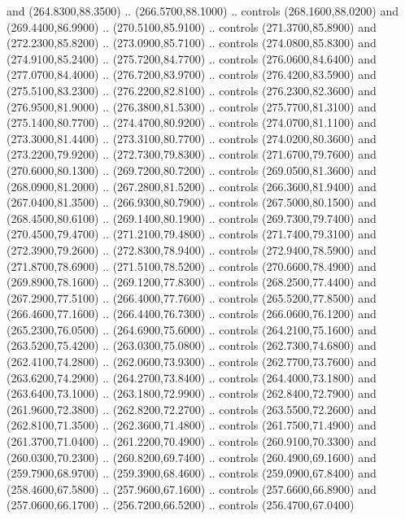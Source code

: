 {\begin{scope}[y=0.80pt, x=0.80pt, yscale=-1, xscale=1, inner sep=0pt, outer sep=0pt, #1]
      and (264.8300,88.3500) .. (266.5700,88.1000) .. controls (268.1600,88.0200)
      and (269.4400,86.9900) .. (270.5100,85.9100) .. controls (271.3700,85.8900)
      and (272.2300,85.8200) .. (273.0900,85.7100) .. controls (274.0800,85.8300)
      and (274.9100,85.2400) .. (275.7200,84.7700) .. controls (276.0600,84.6400)
      and (277.0700,84.4000) .. (276.7200,83.9700) .. controls (276.4200,83.5900)
      and (275.5100,83.2300) .. (276.2200,82.8100) .. controls (276.2300,82.3600)
      and (276.9500,81.9000) .. (276.3800,81.5300) .. controls (275.7700,81.3100)
      and (275.1400,80.7700) .. (274.4700,80.9200) .. controls (274.0700,81.1100)
      and (273.3000,81.4400) .. (273.3100,80.7700) .. controls (274.0200,80.3600)
      and (273.2200,79.9200) .. (272.7300,79.8300) .. controls (271.6700,79.7600)
      and (270.6000,80.1300) .. (269.7200,80.7200) .. controls (269.0500,81.3600)
      and (268.0900,81.2000) .. (267.2800,81.5200) .. controls (266.3600,81.9400)
      and (267.0400,81.3500) .. (266.9300,80.7900) .. controls (267.5000,80.1500)
      and (268.4500,80.6100) .. (269.1400,80.1900) .. controls (269.7300,79.7400)
      and (270.4500,79.4700) .. (271.2100,79.4800) .. controls (271.7400,79.3100)
      and (272.3900,79.2600) .. (272.8300,78.9400) .. controls (272.9400,78.5900)
      and (271.8700,78.6900) .. (271.5100,78.5200) .. controls (270.6600,78.4900)
      and (269.8900,78.1600) .. (269.1200,77.8300) .. controls (268.2500,77.4400)
      and (267.2900,77.5100) .. (266.4000,77.7600) .. controls (265.5200,77.8500)
      and (266.4600,77.1600) .. (266.4400,76.7300) .. controls (266.0600,76.1200)
      and (265.2300,76.0500) .. (264.6900,75.6000) .. controls (264.2100,75.1600)
      and (263.5200,75.4200) .. (263.0300,75.0800) .. controls (262.7300,74.6800)
      and (262.4100,74.2800) .. (262.0600,73.9300) .. controls (262.7700,73.7600)
      and (263.6200,74.2900) .. (264.2700,73.8400) .. controls (264.4000,73.1800)
      and (263.6400,73.1000) .. (263.1800,72.9900) .. controls (262.8400,72.7900)
      and (261.9600,72.3800) .. (262.8200,72.2700) .. controls (263.5500,72.2600)
      and (262.8100,71.3500) .. (262.3600,71.4800) .. controls (261.7500,71.4900)
      and (261.3700,71.0400) .. (261.2200,70.4900) .. controls (260.9100,70.3300)
      and (260.0300,70.2300) .. (260.8200,69.7400) .. controls (260.4900,69.1600)
      and (259.7900,68.9700) .. (259.3900,68.4600) .. controls (259.0900,67.8400)
      and (258.4600,67.5800) .. (257.9600,67.1600) .. controls (257.6600,66.8900)
      and (257.0600,66.1700) .. (256.7200,66.5200) .. controls (256.4700,67.0400)

\end{scope}}
